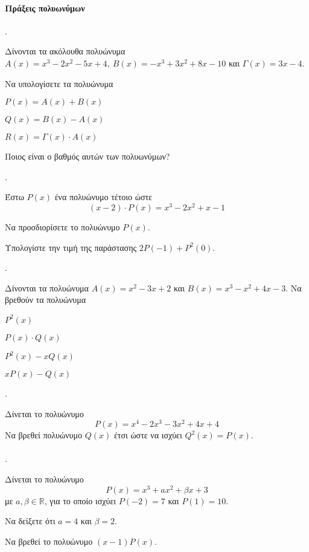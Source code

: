 \documentclass[11pt,a4paper,twocolumn]{article}
\newcounter{askhsh}
\newcommand{\askhsh}{\large\theaskhsh.\ \addtocounter{askhsh}{1}}
\begin{document}
\paragraph{Πράξεις πολυωνύμων}
\askhsh Δίνονται τα ακόλουθα πολυώνυμα $A(x)=x^3-2x^2-5x+4,\ B(x)=-x^3+3x^2+8x-10$ και $\varGamma(x)=3x-4$.
\begin{alist}
\item Να υπολογίσετε τα πολυώνυμα
\begin{rlist}
\item $P(x)=A(x)+B(x)$
\item $Q(x)=B(x)-A(x)$
\item $R(x)=\varGamma(x)\cdot A(x)$
\end{rlist}
\item Ποιος είναι ο βαθμός αυτών των πολυωνύμων?
\end{alist}
\askhsh Έστω $P(x)$ ένα πολυώνυμο τέτοιο ώστε 
\[ (x-2)\cdot P(x)=x^3-2x^2+x-1 \]
\begin{alist}
\item Να προσδιορίσετε το πολυώνυμο $P(x)$.
\item Υπολογίστε την τιμή της παράστασης $2P(-1)+P^2(0)$.
\end{alist}
\askhsh Δίνονται τα πολυώνυμα $A(x)=x^2-3x+2$ και $B(x)=x^3-x^2+4x-3$.
Να βρεθούν τα πολυώνυμα
\begin{multicols}{2}
\begin{alist}
\item $P^2(x)$
\item $P(x)\cdot Q(x)$
\item $P^2(x)-xQ(x)$
\item $xP(x)-Q(x)$
\end{alist}
\end{multicols}
\askhsh Δίνεται το πολυώνυμο \[ P(x)=x^4-2x^3-3x^2+4x+4 \] Να βρεθεί πολυώνυμο $ Q(x) $ έτσι ώστε να ισχύει $ Q^2(x)=P(x) $.\\\\
\askhsh Δίνεται το πολυώνυμο \[P(x)=x^3+ax^2+\beta x+3\]
με $a,\beta\in\mathbb{R}$, για το οποίο ισχύει $P(-2)=7$ και $P(1)=10$.
\begin{alist}
\item Να δείξετε ότι $a=4$ και $\beta=2$.
\item Να βρεθεί το πολυώνυμο $ (x-1)P(x) $.
\end{alist}
\end{document}
